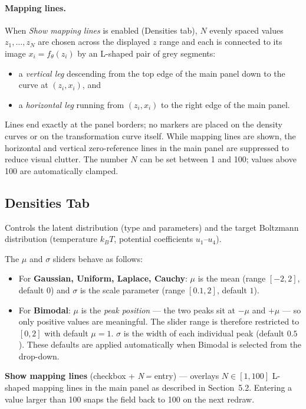 \documentclass[11pt,a4paper]{article}
\newcommand{\ft}{f_{\!\theta}}
\newcommand{\kT}{k_{\!B}T}
\begin{document}
\paragraph{Mapping lines.}
When \emph{Show mapping lines} is enabled (Densities tab), $N$ evenly
spaced values $z_1,\ldots,z_N$ are chosen across the displayed $z$ range
and each is connected to its image $x_i = \ft(z_i)$ by an L-shaped pair
of grey segments:
\begin{itemize}
  \item a \emph{vertical leg} descending from the top edge of the main
        panel down to the curve at $(z_i, x_i)$, and
  \item a \emph{horizontal leg} running from $(z_i, x_i)$ to the right
        edge of the main panel.
\end{itemize}
Lines end exactly at the panel borders; no markers are placed on the
density curves or on the transformation curve itself.  While mapping
lines are shown, the horizontal and vertical zero-reference lines in the
main panel are suppressed to reduce visual clutter.  The number $N$ can
be set between 1 and 100; values above 100 are automatically clamped.

\subsection{Densities Tab}

Controls the latent distribution (type and parameters) and the target
Boltzmann distribution (temperature $\kT$, potential coefficients
$u_1$--$u_4$).

The $\mu$ and $\sigma$ sliders behave as follows:
\begin{itemize}
  \item For \textbf{Gaussian, Uniform, Laplace, Cauchy}: $\mu$ is the
        mean (range $[-2,2]$, default $0$) and $\sigma$ is the scale
        parameter (range $[0.1,2]$, default $1$).
  \item For \textbf{Bimodal}: $\mu$ is the \emph{peak position} — the
        two peaks sit at $-\mu$ and $+\mu$ — so only positive values are
        meaningful.  The slider range is therefore restricted to $[0,2]$
        with default $\mu=1$.  $\sigma$ is the width of each individual
        peak (default $0.5$).  These defaults are applied automatically
        when Bimodal is selected from the drop-down.
\end{itemize}

\textbf{Show mapping lines} (checkbox + \emph{N\,=} entry) — overlays
$N \in [1, 100]$ L-shaped mapping lines in the main panel as described in
Section~5.2.  Entering a value larger than 100 snaps the field back to
100 on the next redraw.
\end{document}
